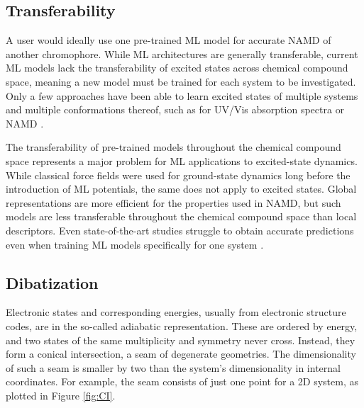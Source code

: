 \documentclass[9pt,bestpractices]{livecoms}
\begin{document}
\subsection{Transferability}
\label{sec:transferability}
A user would ideally use one pre-trained ML model for accurate NAMD of another chromophore. While ML architectures are generally transferable, current ML models lack the transferability of excited states across chemical compound space, meaning a new model must be trained for each system to be investigated. Only a few approaches have been able to learn excited states of multiple systems and multiple conformations thereof, such as for UV/Vis absorption spectra \cite{RN106} or NAMD \cite{RN100}.

The transferability of pre-trained models throughout the chemical compound space represents a major problem for ML applications to excited-state dynamics. While classical force fields were used for ground-state dynamics long before the introduction of ML potentials, the same does not apply to excited states. Global representations are more efficient for the properties used in NAMD, but such models are less transferable throughout the chemical compound space than local descriptors. Even state-of-the-art studies struggle to obtain accurate predictions even when training ML models specifically for one system \cite{RN105}.

\subsection{Dibatization}
\label{sec:diabatization}

Electronic states and corresponding energies, usually from electronic structure codes, are in the so-called adiabatic representation. These are ordered by energy, and two states of the same multiplicity and symmetry never cross. Instead, they form a conical intersection, a seam of degenerate geometries. The dimensionality of such a seam is smaller by two than the system's dimensionality in internal coordinates. For example, the seam consists of just one point for a 2D system, as plotted in Figure \ref{fig:CI}.
\end{document}
